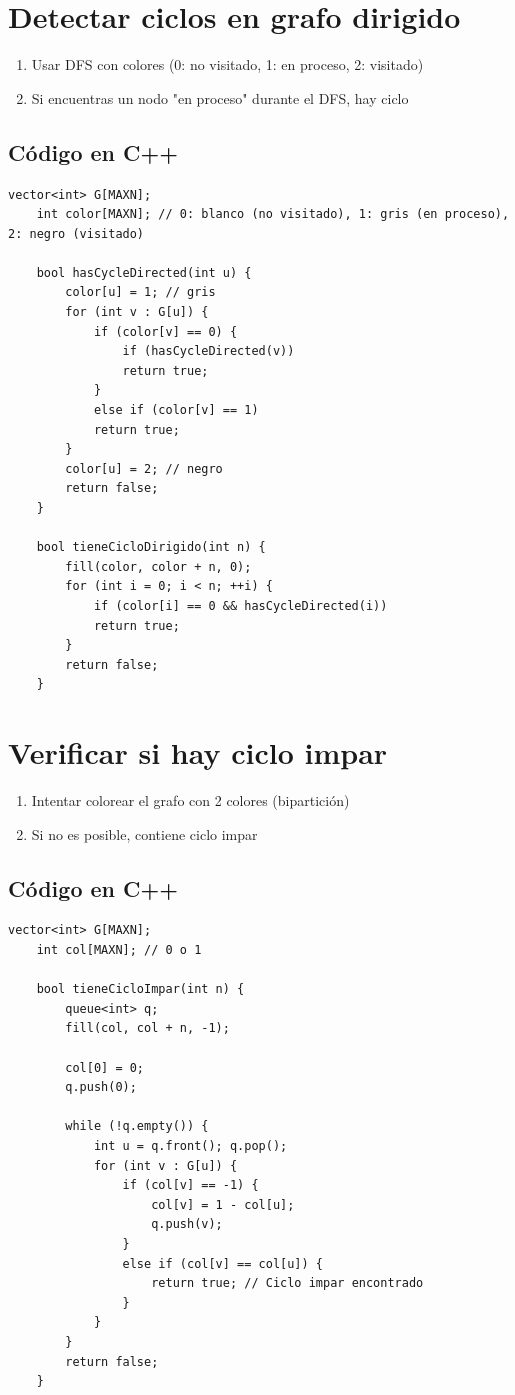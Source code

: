\section{Detectar ciclos en grafo dirigido}

\begin{enumerate}
	\item Usar DFS con colores (0: no visitado, 1: en proceso, 2: visitado)
	\item Si encuentras un nodo "en proceso" durante el DFS, hay ciclo
\end{enumerate}

\subsection*{Código en C++}

\begin{lstlisting}[caption=Detectar ciclos en grafo dirigido]
	vector<int> G[MAXN];
	int color[MAXN]; // 0: blanco (no visitado), 1: gris (en proceso), 2: negro (visitado)
	
	bool hasCycleDirected(int u) {
		color[u] = 1; // gris
		for (int v : G[u]) {
			if (color[v] == 0) {
				if (hasCycleDirected(v)) 
				return true;
			} 
			else if (color[v] == 1) 
			return true;
		}
		color[u] = 2; // negro
		return false;
	}
	
	bool tieneCicloDirigido(int n) {
		fill(color, color + n, 0);
		for (int i = 0; i < n; ++i) {
			if (color[i] == 0 && hasCycleDirected(i))
			return true;
		}
		return false;
	}
\end{lstlisting}

\section{Verificar si hay ciclo impar}

\begin{enumerate}
	\item Intentar colorear el grafo con 2 colores (bipartición)
	\item Si no es posible, contiene ciclo impar
\end{enumerate}

\subsection*{Código en C++}

\begin{lstlisting}[caption=Detectar ciclo impar]
	vector<int> G[MAXN];
	int col[MAXN]; // 0 o 1
	
	bool tieneCicloImpar(int n) {
		queue<int> q;
		fill(col, col + n, -1);
		
		col[0] = 0;
		q.push(0);
		
		while (!q.empty()) {
			int u = q.front(); q.pop();
			for (int v : G[u]) {
				if (col[v] == -1) {
					col[v] = 1 - col[u];
					q.push(v);
				}
				else if (col[v] == col[u]) {
					return true; // Ciclo impar encontrado
				}
			}
		}
		return false;
	}
\end{lstlisting}

